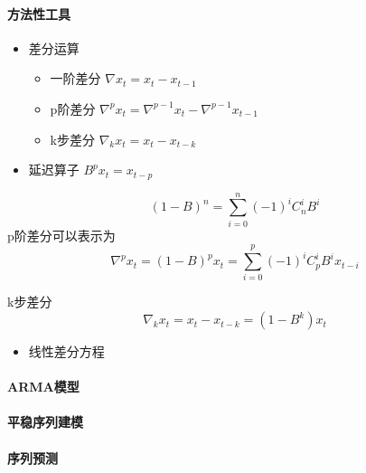 \documentclass[]{article}
\providecommand{\tightlist}{%
  \setlength{\itemsep}{0pt}\setlength{\parskip}{0pt}}
\let\oldparagraph\paragraph
\renewcommand{\paragraph}[1]{\oldparagraph{#1}\mbox{}}
\begin{document}
\hypertarget{ux65b9ux6cd5ux6027ux5de5ux5177}{%
\paragraph{方法性工具}\label{ux65b9ux6cd5ux6027ux5de5ux5177}}

\begin{itemize}
\item
  差分运算

  \begin{itemize}
  \item
    一阶差分 \(\nabla x_t = x_t - x_{t-1}\)
  \item
    p阶差分 \(\nabla^p x_t = \nabla^{p-1}x_t - \nabla^{p-1}x_{t-1}\)
  \item
    k步差分 \(\nabla_kx_t = x_t - x_{t-k}\)
  \end{itemize}
\item
  延迟算子 \(B^px_t = x_{t-p}\)
\end{itemize}

\[
(1-B)^n = \sum\limits_{i=0}^{n}(-1)^iC^i_nB^i
\] p阶差分可以表示为 \[
\nabla^p x_t = (1-B)^px_t = \sum\limits_{i=0}^{p}(-1)^iC^i_pB^ix_{t-i}
\]

k步差分 \[
\nabla_kx_t = x_t - x_{t-k} = (1-B^k)x_t
\]

\begin{itemize}
\tightlist
\item
  线性差分方程
\end{itemize}

\hypertarget{armaux6a21ux578b}{%
\paragraph{ARMA模型}\label{armaux6a21ux578b}}

\hypertarget{ux5e73ux7a33ux5e8fux5217ux5efaux6a21}{%
\paragraph{平稳序列建模}\label{ux5e73ux7a33ux5e8fux5217ux5efaux6a21}}

\hypertarget{ux5e8fux5217ux9884ux6d4b}{%
\paragraph{序列预测}\label{ux5e8fux5217ux9884ux6d4b}}
\end{document}
